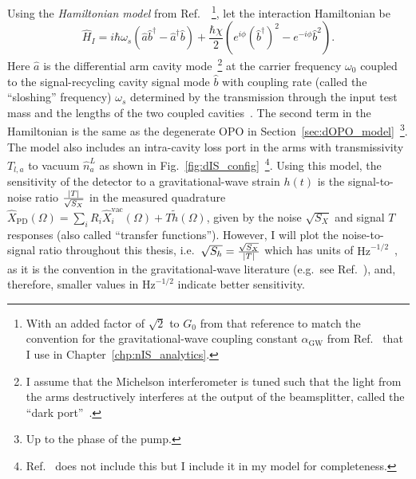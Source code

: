 Using the \emph{Hamiltonian model} from Ref.~\cite{korobkoQuantumExpanderGravitationalwave2019}~\footnote{With an added factor of $\sqrt{2}$ to $G_0$ from that reference to match the convention for the gravitational-wave coupling constant $\alpha_\text{GW}$ from Ref.~\cite{liBroadbandSensitivityImprovement2020} that I use in Chapter~\ref{chp:nIS_analytics}.}, let the interaction Hamiltonian be
\begin{equation}
\hat{H}_I=i\hbar\omega_s(\hat{a}\hat{b}^\dag-\hat{a}^\dag\hat{b})+\frac{\hbar\chi}{2}(e^{i\phi} (\hat b^\dag)^2 - e^{-i\phi} \hat b^2).
\end{equation}
Here $\hat a$ is the differential arm cavity mode~\footnote{I assume that the Michelson interferometer is tuned such that the light from the arms destructively interferes at the output of the beamsplitter, called the ``dark port''~\cite{bond_2010}.} at the carrier frequency $\omega_0$ coupled to the signal-recycling cavity signal mode $\hat b$ with coupling rate (called the ``sloshing'' frequency) $\omega_s$ determined by the transmission through the input test mass and the lengths of the two coupled cavities~\cite{korobkoQuantumExpanderGravitationalwave2019}. %
The second term in the Hamiltonian is the same as the degenerate OPO in Section~\ref{sec:dOPO_model}~\footnote{Up to the phase of the pump.}.
The model also includes an intra-cavity loss port in the arms with transmissivity $T_{l,a}$ to vacuum $\hat n^L_a$ as shown in Fig.~\ref{fig:dIS_config}~\footnote{Ref.~\cite{korobkoQuantumExpanderGravitationalwave2019} does not include this but I include it in my model for completeness.}. 
Using this model, the sensitivity of the detector to a gravitational-wave strain $h(t)$ is the signal-to-noise ratio $\frac{\abs{T}}{\sqrt{S_X}}$ in the measured quadrature $\hat X_\text{PD}(\Omega)=\sum_i R_i \hat X_i^\text{vac}(\Omega) + T \tilde h(\Omega)$, given by the noise $\sqrt{S_X}$ and signal $T$ responses (also called ``transfer functions''). However, I will plot the noise-to-signal ratio throughout this thesis, i.e.\ $\sqrt{S_h}=\frac{\sqrt{S_X}}{\abs{T}}$ which has units of $\text{Hz}^{-1/2}$~\cite{danilishinQuantumMeasurementTheory2012}, as it is the convention in the gravitational-wave literature (e.g.\ see Ref.~\cite{AdvancedLIGO:2015}), and, therefore, smaller values in $\text{Hz}^{-1/2}$ indicate better sensitivity. %

